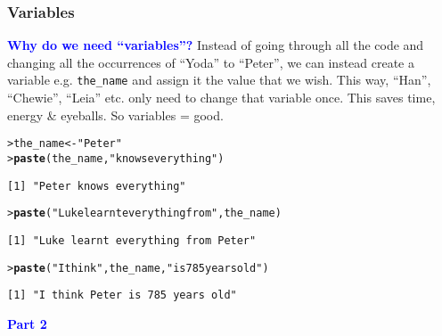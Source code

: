 \documentclass[13pt,aspectratio=169]{beamer}\usepackage[]{graphicx}\usepackage[]{color}
\makeatletter
\newcommand{\hlstr}[1]{\textcolor[rgb]{0.192,0.494,0.8}{#1}}%
\newcommand{\hlstd}[1]{\textcolor[rgb]{0.345,0.345,0.345}{#1}}%
\newcommand{\hlkwb}[1]{\textcolor[rgb]{0.69,0.353,0.396}{#1}}%
\newcommand{\hlkwd}[1]{\textcolor[rgb]{0.737,0.353,0.396}{\textbf{#1}}}%
\newenvironment{kframe}{%
 \def\at@end@of@kframe{}%
 \ifinner\ifhmode%
  \def\at@end@of@kframe{\end{minipage}}%
  \begin{minipage}{\columnwidth}%
 \fi\fi%
 \def\FrameCommand##1{\hskip\@totalleftmargin \hskip-\fboxsep
 \colorbox{shadecolor}{##1}\hskip-\fboxsep
     \hskip-\linewidth \hskip-\@totalleftmargin \hskip\columnwidth}%
 \MakeFramed {\advance\hsize-\width
   \@totalleftmargin\z@ \linewidth\hsize
   \@setminipage}}%
 {\par\unskip\endMakeFramed%
 \at@end@of@kframe}
\newenvironment{knitrout}{}{} %
\newcommand{\tc}[2]{\textcolor{#1}{#2}}
\renewcommand{\tt}[1]{\texttt{#1}}
\renewenvironment{knitrout}{\setlength{\topsep}{0mm}}{}
\makeatother
\begin{document}
\begin{frame}[fragile]
    \frametitle{Variables}
    \textbf{\tc{Blue}{Why do we need ``variables''?}}
    \vskip10pt
    Instead of going through all the code and changing all the
    occurrences of ``Yoda'' to ``Peter'', we can instead create a
    variable e.g. \tt{the\_name} and assign it the value that we
    wish. This way, ``Han'', ``Chewie'', ``Leia'' etc. only need
    to change that variable \alert{once}. This saves time, energy \& eyeballs.
    So variables = good.

\begin{knitrout}\small
{}\color{fgcolor}\begin{kframe}
\begin{alltt}
\hlstd{> }\hlstd{the_name} \hlkwb{<-} \hlstr{"Peter"}
\hlstd{> }\hlkwd{paste}\hlstd{(the_name,} \hlstr{"knows everything"}\hlstd{)}
\end{alltt}
\begin{verbatim}
[1] "Peter knows everything"
\end{verbatim}
\begin{alltt}
\hlstd{> }\hlkwd{paste}\hlstd{(}\hlstr{"Luke learnt everything from"}\hlstd{, the_name)}
\end{alltt}
\begin{verbatim}
[1] "Luke learnt everything from Peter"
\end{verbatim}
\begin{alltt}
\hlstd{> }\hlkwd{paste}\hlstd{(}\hlstr{"I think"}\hlstd{,  the_name,} \hlstr{"is 785 years old"}\hlstd{)}
\end{alltt}
\begin{verbatim}
[1] "I think Peter is 785 years old"
\end{verbatim}
\end{kframe}
\end{knitrout}
\end{frame}


\begin{frame}
    \begin{center}
	\tc{Blue}{\textbf{\Huge{Part 2}}}
    \end{center}
\end{frame}
\end{document}
